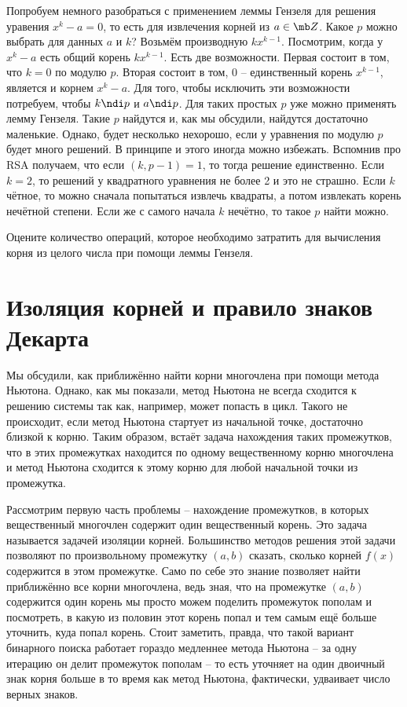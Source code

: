 Попробуем немного разобраться с применением леммы Гензеля для  решения уравения $x^k-a=0$, то есть для извлечения корней из $a \in \mb Z$. Какое  $p$ можно выбрать для данных $a$ и $k$?  
Возьмём производную $kx^{k-1}$. Посмотрим, когда у $x^k-a$ есть общий корень $kx^{k-1}$. Есть две возможности. Первая состоит в том, что $k=0$ по модулю $p$. Вторая состоит в том, $0$ -- единственный корень $x^{k-1}$, является и корнем $x^k-a$.  Для того, чтобы исключить эти возможности потребуем, чтобы $k\ndi p$ и $a\ndi p$. Для таких простых $p$ уже можно применять лемму Гензеля. Такие $p$ найдутся и, как мы обсудили, найдутся достаточно маленькие.  Однако, будет несколько нехорошо, если у уравнения по модулю $p$ будет много решений. В принципе и этого иногда можно избежать. Вспомнив про RSA  получаем, что если $(k,p-1)=1$, то тогда решение единственно. Если $k=2$, то решений у квадратного уравнения не более 2 и это не страшно. Если $k$ чётное, то можно сначала попытаться извлечь квадраты, а потом извлекать корень нечётной степени. Если же с самого начала $k$ нечётно, то такое $p$ найти можно.

\upr Оцените количество операций, которое необходимо затратить для вычисления корня из целого числа при помощи леммы Гензеля.
\eupr



\section{Изоляция корней и правило знаков Декарта}

Мы обсудили, как приближённо найти корни многочлена при помощи метода Ньютона. Однако, как мы показали, метод Ньютона не всегда сходится к решению системы так как, например, может попасть в цикл. Такого не происходит, если метод Ньютона стартует из начальной точке, достаточно близкой к корню. Таким образом, встаёт задача нахождения таких промежутков, что в этих промежутках находится по одному вещественному корню многочлена и метод Ньютона сходится к этому корню для любой начальной точки из промежутка.

Рассмотрим первую часть проблемы -- нахождение промежутков, в которых вещественный многочлен содержит один вещественный корень. Это задача называется задачей изоляции корней. Большинство методов решения этой задачи позволяют по произвольному промежутку $(a,b)$ сказать, сколько корней $f(x)$ содержится в этом промежутке. Само по себе это знание позволяет найти приближённо все корни многочлена, ведь зная, что на промежутке $(a,b)$ содержится один корень мы просто можем поделить промежуток пополам и посмотреть, в какую из половин этот корень попал и тем самым ещё больше уточнить, куда попал корень. Стоит заметить, правда, что такой вариант бинарного поиска работает гораздо медленнее метода Ньютона -- за одну итерацию он делит промежуток пополам -- то есть уточняет на один двоичный знак корня больше в то время как метод Ньютона, фактически, удваивает число верных знаков.

